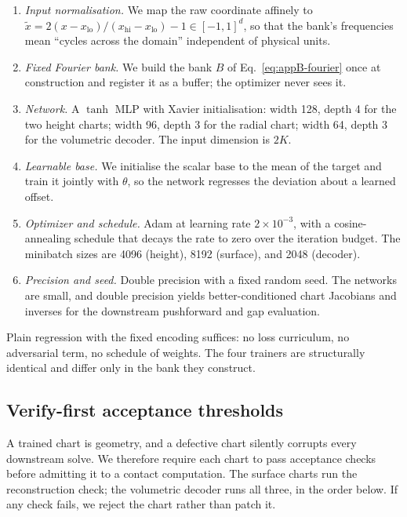 \documentclass{svjour3}                 %
\begin{document}
\begin{appendix}
\begin{enumerate}
\item \emph{Input normalisation.} We map the raw coordinate affinely to $\tilde x=2(x-x_{\mathrm{lo}})/(x_{\mathrm{hi}}-x_{\mathrm{lo}})-1\in[-1,1]^d$, so that the bank's frequencies mean ``cycles across the domain'' independent of physical units.
\item \emph{Fixed Fourier bank.} We build the bank $B$ of Eq.~\eqref{eq:appB-fourier} once at construction and register it as a buffer; the optimizer never sees it.
\item \emph{Network.} A $\tanh$ MLP with Xavier initialisation: width 128, depth 4 for the two height charts; width 96, depth 3 for the radial chart; width 64, depth 3 for the volumetric decoder. The input dimension is $2K$.
\item \emph{Learnable base.} We initialise the scalar $\mathrm{base}$ to the mean of the target and train it jointly with $\theta$, so the network regresses the deviation about a learned offset.
\item \emph{Optimizer and schedule.} Adam at learning rate $2\times10^{-3}$, with a cosine-annealing schedule that decays the rate to zero over the iteration budget. The minibatch sizes are 4096 (height), 8192 (surface), and 2048 (decoder).
\item \emph{Precision and seed.} Double precision with a fixed random seed. The networks are small, and double precision yields better-conditioned chart Jacobians and inverses for the downstream pushforward and gap evaluation.
\end{enumerate}

Plain regression with the fixed encoding suffices: no loss curriculum, no adversarial term, no schedule of weights. The four trainers are structurally identical and differ only in the bank they construct.

\subsection{Verify-first acceptance thresholds}\label{app:training:verify}

A trained chart is geometry, and a defective chart silently corrupts every downstream solve. We therefore require each chart to pass acceptance checks before admitting it to a contact computation. The surface charts run the reconstruction check; the volumetric decoder runs all three, in the order below. If any check fails, we reject the chart rather than patch it.


\end{appendix}
\end{document}
